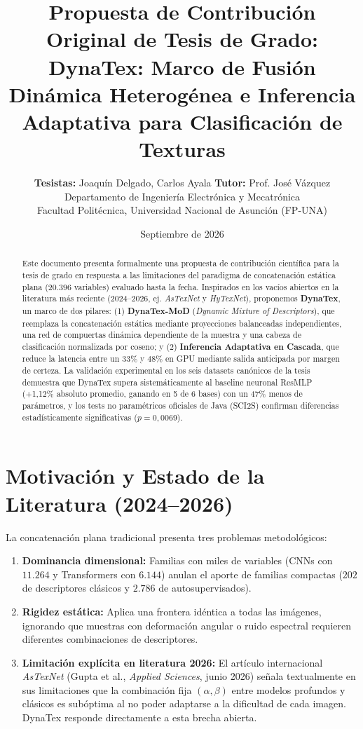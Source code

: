 \documentclass[11pt,a4paper]{article}
\title{\textbf{\Large Propuesta de Contribución Original de Tesis de Grado:}\\
\textbf{\huge DynaTex: Marco de Fusión Dinámica Heterogénea e Inferencia Adaptativa para Clasificación de Texturas}}
\author{\textbf{Tesistas:} Joaquín Delgado, Carlos Ayala \quad \textbf{Tutor:} Prof. José Vázquez\\
\small Departamento de Ingeniería Electrónica y Mecatrónica\\
\small Facultad Politécnica, Universidad Nacional de Asunción (FP-UNA)}
\date{Septiembre de 2026}
\begin{document}
\maketitle

\vspace{-0.5cm}
\begin{abstract}
\noindent Este documento presenta formalmente una propuesta de contribución científica para la tesis de grado en respuesta a las limitaciones del paradigma de concatenación estática plana ($20.396$ variables) evaluado hasta la fecha. Inspirados en los vacíos abiertos en la literatura más reciente (2024--2026, ej. \textit{AsTexNet} y \textit{HyTexNet}), proponemos \textbf{DynaTex}, un marco de dos pilares: (1) \textbf{DynaTex-MoD} (\textit{Dynamic Mixture of Descriptors}), que reemplaza la concatenación estática mediante proyecciones balanceadas independientes, una red de compuertas dinámica dependiente de la muestra y una cabeza de clasificación normalizada por coseno; y (2) \textbf{Inferencia Adaptativa en Cascada}, que reduce la latencia entre un $33\%$ y $48\%$ en GPU mediante salida anticipada por margen de certeza. La validación experimental en los seis datasets canónicos de la tesis demuestra que DynaTex supera sistemáticamente al baseline neuronal ResMLP (+1,12\% absoluto promedio, ganando en 5 de 6 bases) con un 47\% menos de parámetros, y los tests no paramétricos oficiales de Java (SCI2S) confirman diferencias estadísticamente significativas ($p = 0{,}0069$).
\end{abstract}

\section{Motivación y Estado de la Literatura (2024--2026)}
La concatenación plana tradicional presenta tres problemas metodológicos:
\begin{enumerate}
    \item \textbf{Dominancia dimensional:} Familias con miles de variables (CNNs con $11.264$ y Transformers con $6.144$) anulan el aporte de familias compactas ($202$ de descriptores clásicos y $2.786$ de autosupervisados).
    \item \textbf{Rigidez estática:} Aplica una frontera idéntica a todas las imágenes, ignorando que muestras con deformación angular o ruido espectral requieren diferentes combinaciones de descriptores.
    \item \textbf{Limitación explícita en literatura 2026:} El artículo internacional \textit{AsTexNet} (Gupta et al., \textit{Applied Sciences}, junio 2026) señala textualmente en sus limitaciones que la combinación fija $(\alpha, \beta)$ entre modelos profundos y clásicos es subóptima al no poder adaptarse a la dificultad de cada imagen. DynaTex responde directamente a esta brecha abierta.
\end{enumerate}
\end{document}
